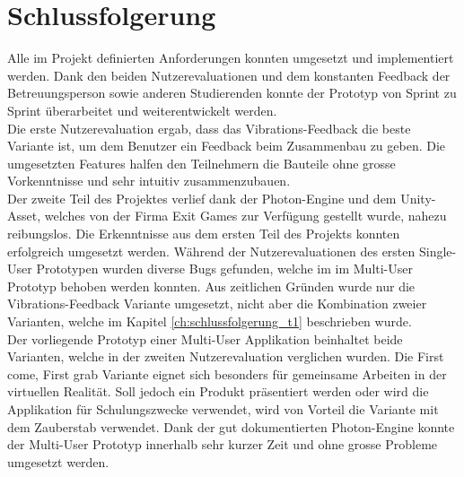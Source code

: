 \chapter{Schlussfolgerung}
\label{ch:Schlussfolgerung}

Alle im Projekt definierten Anforderungen konnten umgesetzt und implementiert werden. Dank den beiden Nutzerevaluationen und dem konstanten Feedback der Betreuungsperson sowie anderen Studierenden konnte der Prototyp von Sprint zu Sprint überarbeitet und weiterentwickelt werden. \\

\noindent Die erste Nutzerevaluation ergab, dass das Vibrations-Feedback die beste Variante ist, um dem Benutzer ein Feedback beim Zusammenbau zu geben. Die umgesetzten Features halfen den Teilnehmern die Bauteile ohne grosse Vorkenntnisse und sehr intuitiv zusammenzubauen. \\

\noindent Der zweite Teil des Projektes verlief dank der Photon-Engine und dem Unity-Asset, welches von der Firma Exit Games zur Verfügung gestellt wurde, nahezu reibungslos. Die Erkenntnisse aus dem ersten Teil des Projekts konnten erfolgreich umgesetzt werden. Während der Nutzerevaluationen des ersten Single-User Prototypen wurden diverse Bugs gefunden, welche im im Multi-User Prototyp behoben werden konnten. Aus zeitlichen Gründen wurde nur die Vibrations-Feedback Variante umgesetzt, nicht aber die Kombination zweier Varianten, welche im Kapitel \ref{ch:schlussfolgerung_t1} beschrieben wurde. \\

\noindent Der vorliegende Prototyp einer Multi-User Applikation beinhaltet beide Varianten, welche in der zweiten Nutzerevaluation verglichen wurden. Die \grqq First come, First grab\grqq{} Variante eignet sich besonders für gemeinsame Arbeiten in der virtuellen Realität. Soll jedoch ein Produkt präsentiert werden oder wird die Applikation für Schulungszwecke verwendet, wird von Vorteil die Variante mit dem Zauberstab verwendet. Dank der gut dokumentierten Photon-Engine konnte der Multi-User Prototyp innerhalb sehr kurzer Zeit und ohne grosse Probleme umgesetzt werden. 